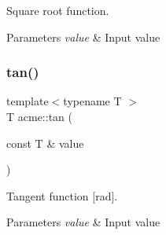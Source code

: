 Square root function. 


\begin{DoxyParams}{Parameters}
{\em value} & Input value \\
\hline
\end{DoxyParams}
\mbox{\label{namespaceacme_a0fa0c6c9aef80a18fe865938fa2cb01d}} 
\subsubsection{\texorpdfstring{tan()}{tan()}}
{\footnotesize\ttfamily template$<$typename T $>$ \\
T acme\+::tan (\begin{DoxyParamCaption}\item[{const T \&}]{value }\end{DoxyParamCaption})\hspace{0.3cm}{\ttfamily [inline]}}



Tangent function \mbox{[}rad\mbox{]}. 


\begin{DoxyParams}{Parameters}
{\em value} & Input value \\
\hline
\end{DoxyParams}
